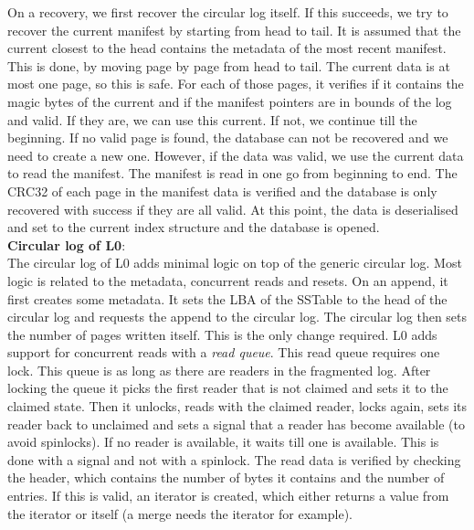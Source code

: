 On a recovery, we first recover the circular log itself. If this succeeds, we try to recover the current manifest by starting from head to tail. It is assumed that the current closest to the head contains the metadata of the most recent manifest. This is done, by moving page by page from head to tail. The current data is at most one page, so this is safe. For each of those pages, it verifies if it contains the magic bytes of the current and if the manifest pointers are in bounds of the log and valid. If they are, we can use this current. If not, we continue till the beginning. If no valid page is found, the database can not be recovered and we need to create a new one. However, if the data was valid, we use the current data to read the manifest. The manifest is read in one go from beginning to end. The CRC32 of each page in the manifest data is verified and the database is only recovered with success if they are all valid. At this point, the data is deserialised and set to the current index structure and the database is opened. \\
\textbf{Circular log of L0}:\\
The circular log of L0 adds minimal logic on top of the generic circular log. Most logic is related to the metadata, concurrent reads and resets. On an append, it first creates some metadata. It sets the LBA of the SSTable to the head of the circular log and requests the append to the circular log. The circular log then sets the number of pages written itself. This is the only change required. L0 adds support for concurrent reads with a \textit{read queue}. This read queue requires one lock. This queue is as long as there are readers in the fragmented log. After locking the queue it picks the first reader that is not claimed and sets it to the claimed state. Then it unlocks, reads with the claimed reader, locks again, sets its reader back to unclaimed and sets a signal that a reader has become available (to avoid spinlocks). If no reader is available, it waits till one is available. This is done with a signal and not with a spinlock. The read data is verified by checking the header, which contains the number of bytes it contains and the number of entries. If this is valid, an iterator is created, which either returns a value from the iterator or itself (a merge needs the iterator for example).

